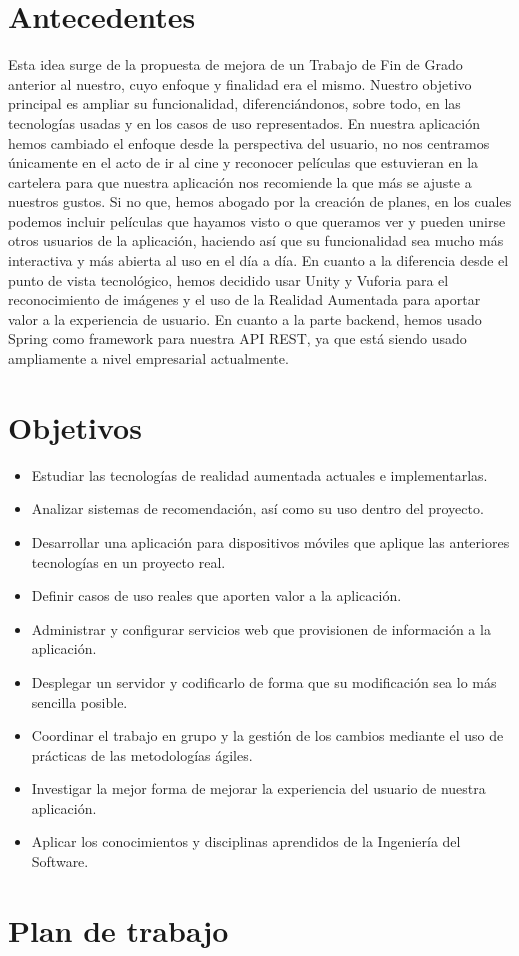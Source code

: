 \section{Antecedentes}
\label{makereference1.1}
\begin{flushleft}
    Esta idea surge de la propuesta de mejora de un Trabajo de Fin de Grado anterior
    al nuestro, cuyo enfoque y finalidad era el mismo. Nuestro objetivo principal es 
    ampliar su funcionalidad, diferenciándonos, sobre todo, en las tecnologías usadas y 
    en los casos de uso representados.
    En nuestra aplicación hemos cambiado el enfoque desde la perspectiva del usuario, no 
    nos centramos únicamente en el acto de ir al cine y reconocer películas que estuvieran en la cartelera
    para que nuestra aplicación nos recomiende la que más se ajuste a nuestros gustos. Si no que, hemos 
    abogado por la creación de planes, en los cuales podemos incluir películas que hayamos visto o que queramos ver
    y pueden unirse otros usuarios de la aplicación, haciendo así que su funcionalidad sea mucho más interactiva y más
    abierta al uso en el día a día.
    En cuanto a la diferencia desde el punto de vista tecnológico, hemos decidido usar Unity y Vuforia para el reconocimiento
    de imágenes y el uso de la Realidad Aumentada para aportar valor a la experiencia de usuario. En cuanto a la parte backend, 
    hemos usado Spring como framework para nuestra API REST, ya que está siendo usado ampliamente a nivel empresarial actualmente.
\end{flushleft}
\newpage
\section{Objetivos}
\label{makereference1.2}
\begin{itemize}  
    \item Estudiar las tecnologías de realidad aumentada actuales e implementarlas.
    \item Analizar sistemas de recomendación, así como su uso dentro del proyecto.
    \item Desarrollar una aplicación para dispositivos móviles que aplique las anteriores tecnologías en un proyecto real.
    \item Definir casos de uso reales que aporten valor a la aplicación.
    \item Administrar y configurar servicios web que provisionen de información a la aplicación.
    \item Desplegar un servidor y codificarlo de forma que su modificación sea lo más sencilla posible.
    \item Coordinar el trabajo en grupo y la gestión de los cambios mediante el uso de prácticas de las metodologías ágiles.
    \item Investigar la mejor forma de mejorar la experiencia del usuario de nuestra aplicación.
    \item Aplicar los conocimientos y disciplinas aprendidos de la Ingeniería del Software.
\end{itemize}

\newpage
\section{Plan de trabajo}
\label{makereference1.3}



